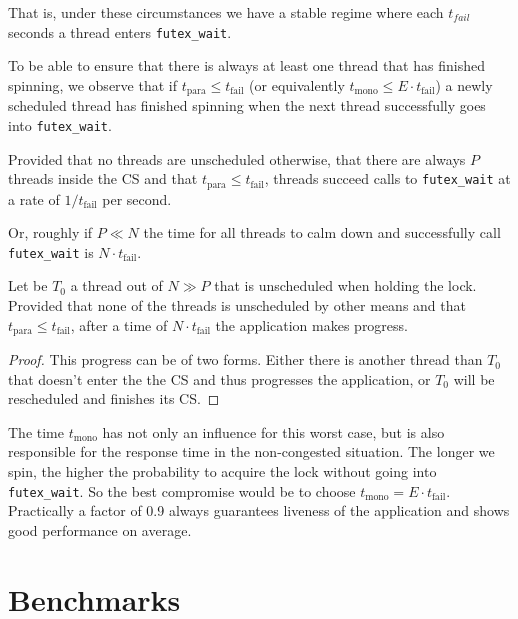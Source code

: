 That is, under these circumstances we have a stable regime where each
$t_{fail}$ seconds a thread enters \texttt{futex\_wait}.

To be able to ensure that there is always at least one thread that
has finished spinning, we observe that if $t_{\textrm{para}} \leq
    t_{\textrm{fail}}$ (or equivalently $t_{\textrm{mono}} \leq E\cdot
    t_{\textrm{fail}}$) a newly scheduled thread has finished spinning
when the next thread successfully goes into \texttt{futex\_wait}.

\begin{lemma}
Provided that no threads are unscheduled otherwise, that there are
always $P$ threads inside the CS and that $t_{\textrm{para}} \leq
    t_{\textrm{fail}}$, threads succeed calls to \texttt{futex\_wait} at a rate of
$1/t_{\textrm{fail}}$ per second.
\end{lemma}

Or, roughly if $P \ll N$ the time for all threads to calm down and
successfully call \texttt{futex\_wait} is $N\cdot t_{\textrm{fail}}$.

\begin{theorem}
Let be $T_0$ a thread out of $N \gg P$ that is unscheduled when
holding the lock.  Provided that none of the threads is
unscheduled by other means and that $t_{\textrm{para}} \leq
    t_{\textrm{fail}}$, after a time of $N\cdot t_{\textrm{fail}}$ the
application makes progress.
\end{theorem}

\begin{proof}
This progress can be of two forms.  Either there is another thread
than $T_{0}$ that doesn't enter the the CS and thus
progresses the application, or $T_0$ will be rescheduled and
finishes its CS.
\end{proof}

The time $t_{\textrm{mono}}$ has not only an influence for this
worst case, but is also responsible for the response time in the
non-congested situation. The longer we spin, the higher the
probability to acquire the lock without going into
\texttt{futex\_wait}. So the best compromise would be to choose
$t_{\textrm{mono}} = E\cdot t_{\textrm{fail}}$. Practically a
factor of 0.9 always guarantees liveness of the application and
shows good performance on average.

\section{Benchmarks}
\label{sec-4}

